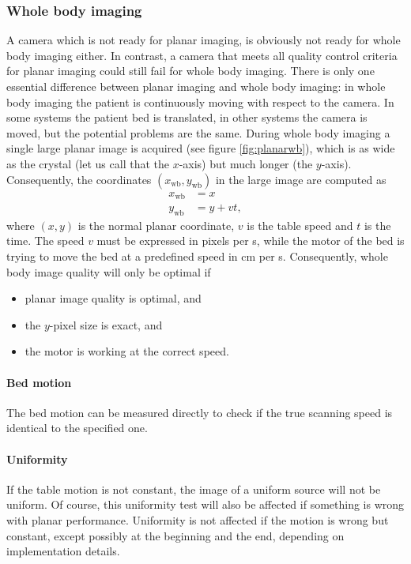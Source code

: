 \documentclass[11pt,oneside]{article}
\begin{document}
\subsubsection{Whole body imaging}
A camera which is not ready for planar imaging, is obviously not ready
for whole body imaging either. In contrast, a camera that meets all
quality control criteria for planar imaging could still fail for whole
body imaging. There is only one essential difference between planar
imaging and whole body imaging: in whole body imaging the patient is
continuously moving with respect to the camera. In some systems the
patient bed is translated, in other systems the camera is moved, but
the potential problems are the same. During whole body imaging a
single large planar image is acquired (see figure
\ref{fig:planarwb}), which is as wide as the crystal (let us call
that the $x$-axis) but much longer (the $y$-axis). Consequently, the
coordinates $(x_{\mbox{wb}}, y_{\mbox{wb}})$ in the large image are
computed as
\begin{align}
  x_{\mbox{wb}} &= x\\
  y_{\mbox{wb}} &= y + v t,
\end{align}
where $(x,y)$ is the normal planar coordinate, $v$ is the table speed and $t$
is the time. The speed $v$ must be expressed in pixels per s, while the motor
of the bed is trying to move the bed at a predefined speed in cm per
s. Consequently, whole body image quality will only be optimal if
\begin{itemize}
  \item planar image quality is optimal, and
  \item the $y$-pixel size is exact, and
  \item the motor is working at the correct speed.
\end{itemize}

\paragraph{Bed motion}
The bed motion can be measured directly to check if the true scanning
speed is identical to the specified one.

\paragraph{Uniformity}
If the table motion is not constant, the image of a uniform source will not be
uniform. Of course, this uniformity test will also be affected if something is
wrong with planar performance. Uniformity is not affected if the motion is
wrong but constant, except possibly at the beginning and the end, depending on
implementation details.
\end{document}
